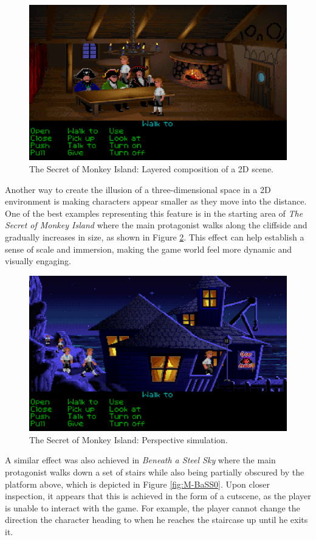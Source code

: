 \begin{figure}[H]
\centering
\includegraphics[width=.8\linewidth]{img/M-TSoMI0.png}
\caption{The Secret of Monkey Island: Layered composition of a 2D scene.}
\label{fig:M-TSoMI0}
\end{figure}

Another way to create the illusion of a three-dimensional space in a 2D environment is making characters appear smaller as they move into the distance. One of the best examples representing this feature is in the starting area of \textit{The Secret of Monkey Island} where the main protagonist walks along the cliffside and gradually increases in size, as shown in Figure \ref{fig:M-TSoMI}. This effect can help establish a sense of scale and immersion, making the game world feel more dynamic and visually engaging. 

\begin{figure}[H]
\centering
\includegraphics[width=.8\linewidth]{img/M-TSoMI.png}
\caption{The Secret of Monkey Island: Perspective simulation.}
\label{fig:M-TSoMI}
\end{figure}

A similar effect was also achieved in \textit{Beneath a Steel Sky} where the main protagonist walks down a set of stairs while also being partially obscured by the platform above, which is depicted in Figure \ref{fig:M-BaSS0}. Upon closer inspection, it appears that this is achieved in the form of a cutscene, as the player is unable to interact with the game. For example, the player cannot change the direction the character heading to when he reaches the staircase up until he exits it. 



